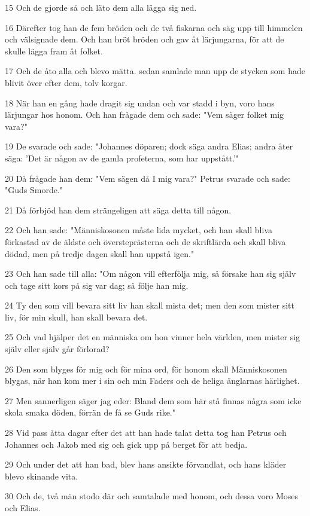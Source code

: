 \par 15 Och de gjorde så och läto dem alla lägga sig ned.
\par 16 Därefter tog han de fem bröden och de två fiskarna och säg upp till himmelen och välsignade dem. Och han bröt bröden och gav åt lärjungarna, för att de skulle lägga fram åt folket.
\par 17 Och de åto alla och blevo mätta. sedan samlade man upp de stycken som hade blivit över efter dem, tolv korgar.
\par 18 När han en gång hade dragit sig undan och var stadd i byn, voro hans lärjungar hos honom. Och han frågade dem och sade: "Vem säger folket mig vara?"
\par 19 De svarade och sade: "Johannes döparen; dock säga andra Elias; andra åter säga: 'Det är någon av de gamla profeterna, som har uppstått.'"
\par 20 Då frågade han dem: "Vem sägen då I mig vara?" Petrus svarade och sade: "Guds Smorde."
\par 21 Då förbjöd han dem strängeligen att säga detta till någon.
\par 22 Och han sade: "Människosonen måste lida mycket, och han skall bliva förkastad av de äldste och översteprästerna och de skriftlärda och skall bliva dödad, men på tredje dagen skall han uppstå igen."
\par 23 Och han sade till alla: "Om någon vill efterfölja mig, så försake han sig själv och tage sitt kors på sig var dag; så följe han mig.
\par 24 Ty den som vill bevara sitt liv han skall mista det; men den som mister sitt liv, för min skull, han skall bevara det.
\par 25 Och vad hjälper det en människa om hon vinner hela världen, men mister sig själv eller själv går förlorad?
\par 26 Den som blyges för mig och för mina ord, för honom skall Människosonen blygas, när han kom mer i sin och min Faders och de heliga änglarnas härlighet.
\par 27 Men sannerligen säger jag eder: Bland dem som här stå finnas några som icke skola smaka döden, förrän de få se Guds rike."
\par 28 Vid pass åtta dagar efter det att han hade talat detta tog han Petrus och Johannes och Jakob med sig och gick upp på berget för att bedja.
\par 29 Och under det att han bad, blev hans ansikte förvandlat, och hans kläder blevo skinande vita.
\par 30 Och de, två män stodo där och samtalade med honom, och dessa voro Moses och Elias.
